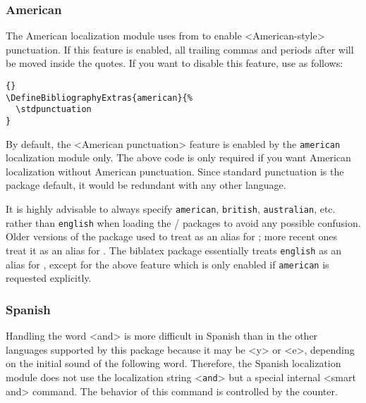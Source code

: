 \documentclass{ltxdockit}[2011/03/25]
\begin{document}
\subsubsection{American}
\label{use:loc:us}

The American localization module uses  from  to enable <American-style> punctuation. If this feature is enabled, all trailing commas and periods after  will be moved inside the quotes. If you want to disable this feature, use  as follows:

\begin{lstlisting}[style=latex]{}
\DefineBibliographyExtras{american}{%
  \stdpunctuation
}
\end{lstlisting}
%
By default, the <American punctuation> feature is enabled by the \texttt{american} localization module only. The above code is only required if you want American localization without American punctuation. Since standard punctuation is the package default, it would be redundant with any other language.

It is highly advisable to always specify \texttt{american}, \texttt{british}, \texttt{australian}, etc. rather than \texttt{english} when loading the / packages to avoid any possible confusion. Older versions of the  package used to treat  as an alias for ; more recent ones treat it as an alias for . The biblatex package essentially treats \texttt{english} as an alias for , except for the above feature which is only enabled if \texttt{american} is requested explicitly.

\subsubsection{Spanish}
\label{use:loc:esp}

Handling the word <and> is more difficult in Spanish than in the other languages supported by this package because it may be <y> or <e>, depending on the initial sound of the following word. Therefore, the Spanish localization module does not use the localization string <\texttt{and}> but a special internal <smart and> command. The behavior of this command is controlled by the  counter.
\end{document}
